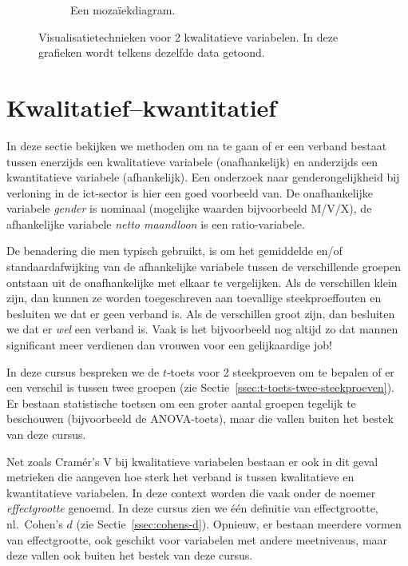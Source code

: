 \begin{figure}
\begin{subfigure}{.33\textwidth}
    \caption{Een mozaïekdiagram.}
    \label{fig:mozaiekdiagram}
  \end{subfigure}
  \caption[Visualisatietechnieken voor 2 kwalitatieve variabelen]{Visualisatietechnieken voor 2 kwalitatieve variabelen. In deze grafieken wordt telkens dezelfde data getoond.}
\end{figure}


\section{Kwalitatief--kwantitatief}
\label{sec:kwal-kwant}

In deze sectie bekijken we methoden om na te gaan of er een verband bestaat tussen enerzijds een kwalitatieve variabele (onafhankelijk) en anderzijds een kwantitatieve variabele (afhankelijk). Een onderzoek naar genderongelijkheid bij verloning in de ict-sector is hier een goed voorbeeld van. De onafhankelijke variabele \emph{gender} is nominaal (mogelijke waarden bijvoorbeeld M/V/X), de afhankelijke variabele \emph{netto maandloon} is een ratio-variabele.

De benadering die men typisch gebruikt, is om het gemiddelde en/of standaardafwijking van de afhankelijke variabele tussen de verschillende groepen ontstaan uit de onafhankelijke met elkaar te vergelijken. Als de verschillen klein zijn, dan kunnen ze worden toegeschreven aan toevallige steekproeffouten en besluiten we dat er geen verband is. Als de verschillen groot zijn, dan besluiten we dat er \emph{wel} een verband is. Vaak is het bijvoorbeeld nog altijd zo dat mannen significant meer verdienen dan vrouwen voor een gelijkaardige job!

In deze cursus bespreken we de $t$-toets voor 2 steekproeven om te bepalen of er een verschil is tussen twee groepen (zie Sectie~\ref{ssec:t-toets-twee-steekproeven}). Er bestaan statistische toetsen om een groter aantal groepen tegelijk te beschouwen (bijvoorbeeld de ANOVA-toets), maar die vallen buiten het bestek van deze cursus.

Net zoals Cramér's V bij kwalitatieve variabelen bestaan er ook in dit geval metrieken die aangeven hoe sterk het verband is tussen kwalitatieve en kwantitatieve variabelen. In deze context worden die vaak onder de noemer \emph{effectgrootte} genoemd. In deze cursus zien we één definitie van effectgrootte, nl.~Cohen's $d$ (zie Sectie~\ref{ssec:cohens-d}). Opnieuw, er bestaan meerdere vormen van effectgrootte, ook geschikt voor variabelen met andere meetniveaus, maar deze vallen ook buiten het bestek van deze cursus.

